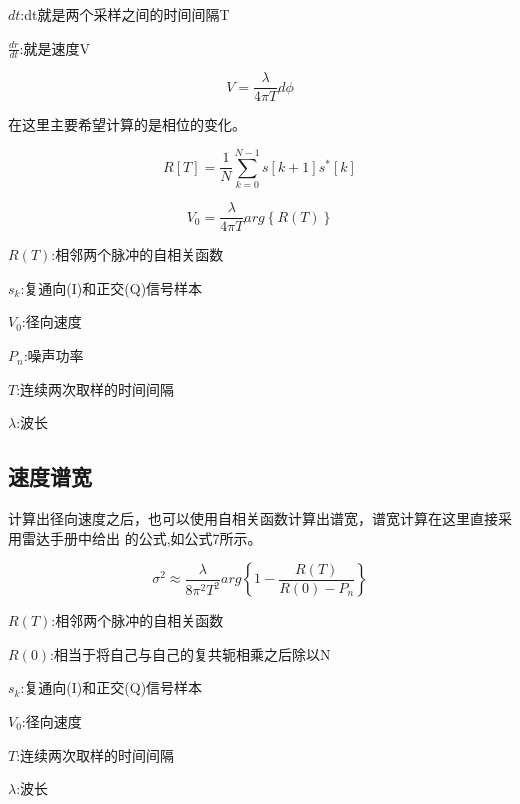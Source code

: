\documentclass[a4paper,12pt]{report}
\begin{document}
\begin{spacing}{1.5}
\begin{enumerate}[1)]
\begin{proposition}[相位计算推导公式]
        $dt$:dt就是两个采样之间的时间间隔T

        $\frac{dr}{dt}$:就是速度V

        \begin{equation}
           V=\frac{\lambda}{4\pi T}d\phi
        \end{equation}

    \end{proposition}

    在这里主要希望计算的是相位的变化。

    \begin{proposition}

    \begin{equation}
        R[T]=\frac{1}{N}\sum_{k=0}^{N-1}s[k+1]s^*[k]
    \end{equation}

    \begin{equation}
        V_0=\frac{\lambda}{4\pi T}arg\left\{R(T)\right\}
    \end{equation}

    $R(T)$:相邻两个脉冲的自相关函数

    $s_k$:复通向(I)和正交(Q)信号样本

    $V_0$:径向速度

    $P_n$:噪声功率

    $T$:连续两次取样的时间间隔

    $\lambda$:波长

    \end{proposition}

\end{enumerate}

\subsection{速度谱宽}

计算出径向速度之后，也可以使用自相关函数计算出谱宽，谱宽计算在这里直接采用雷达手册中给出
的公式,如公式7所示。

    \begin{proposition}

    \begin{equation}
        \sigma^2\approx\frac{\lambda}{8\pi^2 T^2}arg\left\{1-\frac{R(T)}{R(0)-P_n}\right\}
    \end{equation}

    $R(T)$:相邻两个脉冲的自相关函数

    $R(0)$:相当于将自己与自己的复共轭相乘之后除以N

    $s_k$:复通向(I)和正交(Q)信号样本

    $V_0$:径向速度

    $T$:连续两次取样的时间间隔

    $\lambda$:波长

    \end{proposition}

\end{spacing}
\end{document}
